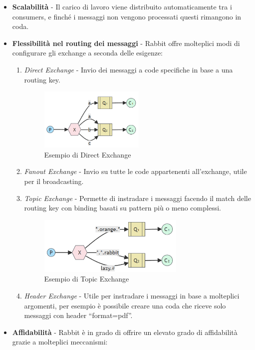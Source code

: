 \begin{itemize}
  \item \textbf{Scalabilit\`a} -  Il carico di lavoro viene distribuito automaticamente tra i consumers, e finch\'e i messaggi
    non vengono processati questi rimangono in coda.
  \item \textbf{Flessibilit\`a nel routing dei messaggi} - Rabbit offre molteplici modi di configurare gli exchange a seconda delle esigenze:
    \begin{enumerate}
      \item \textit{Direct Exchange} - Invio dei messaggi a code specifiche in base a una routing key.
        \begin{figure}[H]
          \centering
          \includegraphics[width=5cm]{images/rabbitmq-direct-exchange.png}
          \caption{Esempio di Direct Exchange\cite{rabbitmq}}
        \end{figure}
      \item \textit{Fanout Exchange} - Invio su tutte le code appartenenti all'exchange, utile per il broadcasting.
      \item \textit{Topic Exchange} - Permette di instradare i messaggi facendo il match delle routing key con binding basati su pattern pi\`u o meno complessi.
        \begin{figure}[H]
          \centering
          \includegraphics[width=7cm]{images/rabbitmq-topic-exchange.png}
          \caption{Esempio di Topic Exchange\cite{rabbitmq}}
        \end{figure}
      \item \textit{Header Exchange} - Utile per instradare i messaggi in base a molteplici argomenti, per esempio \`e possibile creare una coda
        che riceve solo messaggi con header ``format=pdf''.
    \end{enumerate}
  \item \textbf{Affidabilit\`a} -  Rabbit \`e in grado di offrire un elevato grado di affidabilit\`a grazie a  molteplici meccanismi:

\end{itemize}
